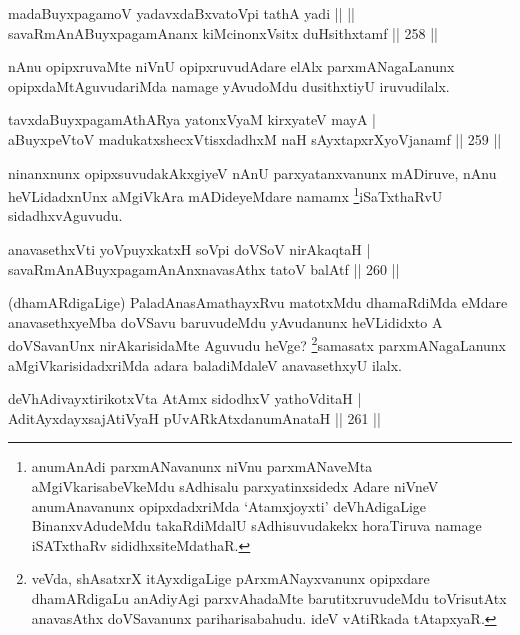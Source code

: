\begin{shl}
madaBuyxpagamoV yadavxdaBxvatoV\s pi tathA yadi ||  ||  \\
savaRmAnABuyxpagamAnanx kiMcinonxV\s sitx duHsithxtamf \hfill ||  258 ||  
\end{shl}

\begin{artha}
nAnu opipxruvaMte niVnU opipxruvudAdare elAlx parxmANagaLanunx opipxdaMtAguvudariMda namage yAvudoMdu dusithxtiyU iruvudilalx.
\end{artha}

\begin{shl}
tavxdaBuyxpagamAthARya yatonxV\s yaM kirxyateV mayA | \\
aBuyxpeVtoV madukatxshecxVtisxdadhxM naH sAyxtapxrXyoVjanamf \hfill ||  259 ||  
\end{shl}

\begin{artha}
ninanxnunx opipxsuvudakAkxgiyeV nAnU parxyatanxvanunx mADiruve, nAnu heVLidadxnUnx aMgiVkAra mADideyeMdare namamx \footnote{anumAnAdi parxmANavanunx niVnu parxmANaveMta aMgiVkarisabeVkeMdu sAdhisalu parxyatinxsidedx Adare niVneV anumAnavanunx opipxdadxriMda `Atamxjoyxti' deVhAdigaLige BinanxvAdudeMdu takaRdiMdalU sAdhisuvudakekx horaTiruva namage iSATxthaRv sididhxsiteMdathaR.}iSaTxthaRvU sidadhxvAguvudu.
\end{artha}

\begin{shl}
anavasethxVti yoV\s puyxkatxH soV\s pi doVSoV nirAkaqtaH | \\
savaRmAnABuyxpagamAnAnxnavasAthx tatoV balAtf \hfill ||  260 || 
\end{shl}

\begin{artha}
(dhamARdigaLige) PaladAnasAmathayxRvu matotxMdu dhamaRdiMda eMdare anavasethxyeMba doVSavu baruvudeMdu yAvudanunx heVLididxto A doVSavanUnx nirAkarisidaMte Aguvudu heVge? \footnote{veVda, shAsatxrX itAyxdigaLige pArxmANayxvanunx opipxdare dhamARdigaLu anAdiyAgi parxvAhadaMte barutitxruvudeMdu toVrisutAtx anavasAthx doVSavanunx pariharisabahudu. ideV vAtiRkada tAtapxyaR.}samasatx parxmANagaLanunx aMgiVkarisidadxriMda adara baladiMdaleV anavasethxyU ilalx.
\end{artha}


\begin{shl}
\footnotemark[1]{}deVhAdivayxtirikotxV\s ta AtAmx sidodhxV yathoVditaH | \\
AditAyxdayxsajAtiVyaH pUvARkAtxdanumAnataH \hfill ||  261 ||  
\end{shl}

